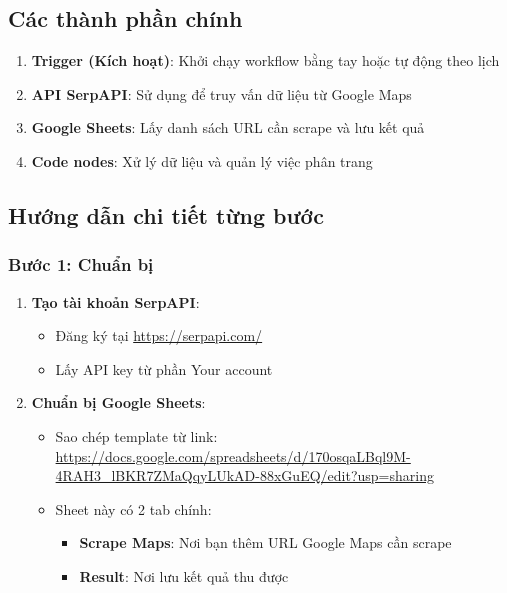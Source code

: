 \subsection{Các thành phần chính}

\begin{enumerate}
  \item \textbf{Trigger (Kích hoạt)}: Khởi chạy workflow bằng tay hoặc tự động theo lịch
  \item \textbf{API SerpAPI}: Sử dụng để truy vấn dữ liệu từ Google Maps
  \item \textbf{Google Sheets}: Lấy danh sách URL cần scrape và lưu kết quả
  \item \textbf{Code nodes}: Xử lý dữ liệu và quản lý việc phân trang
\end{enumerate}

\subsection{Hướng dẫn chi tiết từng bước}

\subsubsection{Bước 1: Chuẩn bị}

\begin{enumerate}
  \item \textbf{Tạo tài khoản SerpAPI}:
  \begin{itemize}
    \item Đăng ký tại \url{https://serpapi.com/}
    \item Lấy API key từ phần Your account
  \end{itemize}

  \item \textbf{Chuẩn bị Google Sheets}:
  \begin{itemize}
    \item Sao chép template từ link: \url{https://docs.google.com/spreadsheets/d/170osqaLBql9M-4RAH3_lBKR7ZMaQqyLUkAD-88xGuEQ/edit?usp=sharing}
    \item Sheet này có 2 tab chính:
    \begin{itemize}
      \item \textbf{Scrape Maps}: Nơi bạn thêm URL Google Maps cần scrape
      \item \textbf{Result}: Nơi lưu kết quả thu được
    \end{itemize}
  \end{itemize}
\end{enumerate}

